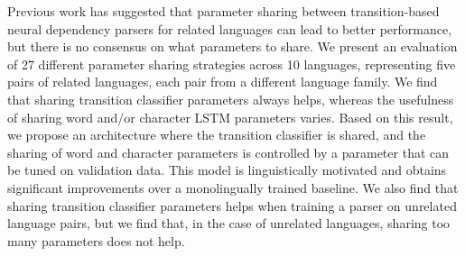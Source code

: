 Previous work has suggested that parameter sharing between transition-based neural dependency parsers for related languages can lead to better performance, but there is no consensus on what parameters to share. We present an evaluation of 27 different parameter sharing strategies across 10 languages, representing five pairs of related languages, each pair from a different language family. We find that sharing transition classifier parameters always helps, whereas the usefulness of sharing word and/or character LSTM parameters varies. Based on this result, we propose an architecture where the transition classifier is shared, and the sharing of word and character parameters is controlled by a parameter that can be tuned on validation data. This model is linguistically motivated and obtains significant improvements over a monolingually trained baseline. We also find that sharing transition classifier parameters helps when training a parser on unrelated language pairs, but we find that, in the case of unrelated languages, sharing too many parameters does not help.
